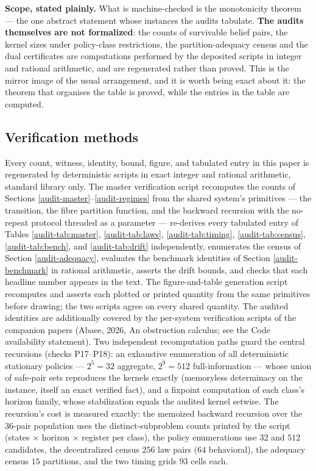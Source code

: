 \documentclass[10pt,twocolumn]{article}
\theoremstyle{plain}
\theoremstyle{definition}
\theoremstyle{remark}
\begin{document}
\noindent\textbf{Scope, stated plainly.} What is machine-checked is the monotonicity
theorem --- the one abstract statement whose instances the audits tabulate. \textbf{The audits
themselves are not formalized}: the counts of survivable belief pairs, the kernel sizes under
policy-class restrictions, the partition-adequacy census and the dual certificates are
computations performed by the deposited scripts in integer and rational arithmetic, and are
regenerated rather than proved. This is the mirror image of the usual arrangement, and it is
worth being exact about it: the theorem that organises the table is proved, while the entries
in the table are computed.

\subsection{Verification methods}\label{audit-methods}

Every count, witness, identity, bound, figure, and tabulated entry in
this paper is regenerated by deterministic scripts in exact integer and
rational arithmetic, standard library only. The master verification
script recomputes the counts of Sections \ref{audit-master}--\ref{audit-regimes}
from the shared system's primitives --- the transition, the fibre
partition function, and the backward recursion with the no-repeat
protocol threaded as a parameter --- re-derives every tabulated entry of
Tables \ref{audit-tab:master}, \ref{audit-tab:laws}, \ref{audit-tab:timing},
\ref{audit-tab:census}, \ref{audit-tab:bench}, and \ref{audit-tab:drift} independently,
enumerates the census of Section \ref{audit-adequacy}, evaluates the
benchmark identities of Section \ref{audit-benchmark} in rational
arithmetic, asserts the drift bounds, and checks that each headline
number appears in the text. The figure-and-table generation script
recomputes and asserts each plotted or printed quantity from the same
primitives before drawing; the two scripts agree on every shared
quantity. The audited identities are additionally covered by the
per-system verification scripts of the companion papers (Abaee, 2026, An obstruction calculus;
see the Code availability statement). Two independent recomputation
paths guard the central recursions (checks P17--P18): an exhaustive
enumeration of all deterministic stationary policies --- \(2^{5} = 32\)
aggregate, \(2^{9} = 512\) full-information --- whose union of
safe-pair sets reproduces the kernels exactly (memoryless determinacy
on the instance, itself an exact verified fact), and a fixpoint
computation of each class's horizon family, whose stabilization equals
the audited kernel setwise. The recursion's cost is measured exactly:
the memoized backward recursion over the \(36\)-pair population uses
the distinct-subproblem counts printed by the script (states \(\times\)
horizon \(\times\) register per class), the policy enumerations use
\(32\) and \(512\) candidates, the decentralized census \(256\) law
pairs (\(64\) behavioral), the adequacy census \(15\) partitions, and
the two timing grids \(93\) cells each.
\end{document}
